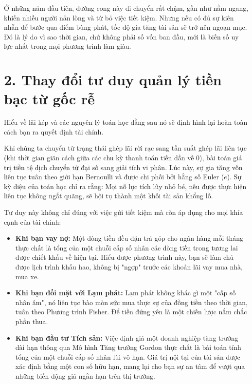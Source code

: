 \documentclass[14pt, a4paper, oneside]{extreport}
\begin{document}
Ở những năm đầu tiên, đường cong này di chuyển rất chậm, gần như nằm ngang, khiến nhiều người nản lòng và từ bỏ việc tiết kiệm. Nhưng nếu có đủ sự kiên nhẫn để bước qua điểm bùng phát, tốc độ gia tăng tài sản sẽ trở nên ngoạn mục. Đó là lý do vì sao thời gian, chứ không phải số vốn ban đầu, mới là biến số uy lực nhất trong mọi phương trình làm giàu.

\section*{2. Thay đổi tư duy quản lý tiền bạc từ gốc rễ}

Hiểu về lãi kép và các nguyên lý toán học đằng sau nó sẽ định hình lại hoàn toàn cách bạn ra quyết định tài chính. 

Khi chúng ta chuyển từ trạng thái ghép lãi rời rạc sang tần suất ghép lãi liên tục (khi thời gian giãn cách giữa các chu kỳ thanh toán tiến dần về 0), bài toán giá trị tiền tệ dịch chuyển từ đại số sang giải tích vi phân. Lúc này, sự gia tăng vốn liên tục tuân theo giới hạn Bernoulli và được chi phối bởi hằng số Euler ($e$). Sự kỳ diệu của toán học chỉ ra rằng: Mọi nỗ lực tích lũy nhỏ bé, nếu được thực hiện liên tục không ngắt quãng, sẽ hội tụ thành một khối tài sản khổng lồ.

Tư duy này không chỉ đúng với việc gửi tiết kiệm mà còn áp dụng cho mọi khía cạnh của tài chính:
\begin{itemize}
    \item \textbf{Khi bạn vay nợ:} Một dòng tiền đều đặn trả góp cho ngân hàng mỗi tháng thực chất là tổng của một chuỗi cấp số nhân các dòng tiền trong tương lai được chiết khấu về hiện tại. Hiểu được phương trình này, bạn sẽ làm chủ được lịch trình khấu hao, không bị "ngợp" trước các khoản lãi vay mua nhà, mua xe.
    \item \textbf{Khi bạn đối mặt với Lạm phát:} Lạm phát không khác gì một "cấp số nhân âm", nó liên tục bào mòn sức mua thực sự của đồng tiền theo thời gian, tuân theo Phương trình Fisher. Để tiền đứng yên là một chiến lược nắm chắc phần thua.
    \item \textbf{Khi bạn đầu tư Tích sản:} Việc định giá một doanh nghiệp tăng trưởng dài hạn thông qua Mô hình Tăng trưởng Gordon thực chất là bài toán tính tổng của một chuỗi cấp số nhân lùi vô hạn. Giá trị nội tại của tài sản được xác định bằng một con số hữu hạn, mang lại cho bạn sự an tâm để vượt qua những biến động giá ngắn hạn trên thị trường.
\end{itemize}
\end{document}
